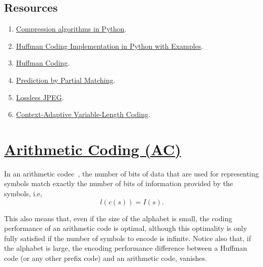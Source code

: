 \subsection*{Resources}
\begin{enumerate}
\item \href{https://www.inference.org.uk/mackay/python/compress/#Huff}{Compression algorithms in Python}.
\item \href{https://favtutor.com/blogs/huffman-coding}{Huffman Coding Implementation in Python with Examples}.
\item \href{https://www.programiz.com/dsa/huffman-coding}{Huffman Coding}.
\item \href{https://en.wikipedia.org/wiki/Prediction_by_partial_matching}{Prediction by Partial Matching}.
\item \href{https://en.wikipedia.org/wiki/Lossless_JPEG}{Lossless JPEG}.
\item \href{https://en.wikipedia.org/wiki/Context-adaptive_variable-length_coding}{Context-Adaptive Variable-Length Coding}.
\end{enumerate}

\section{\href{https://en.wikipedia.org/wiki/Arithmetic_coding}{Arithmetic
    Coding (AC)}}

In an arithmetic codec~\cite{vruiz__arithmetic_coding,ruiz2000compresion}, the number of
bits of data that are used for representing symbols match
exactly the number of bits of information provided by the symbols, i.e,
\begin{equation}
  l(c(s)) = I(s).
\end{equation}

This also means that, even if the size of the alphabet is small, the
coding performance of an arithmetic code is optimal, although this
optimality is only fully satisfied if the number of symbols to encode
is infinite. Notice also that, if the alphabet is large, the encoding
performance difference between a Huffman code (or any other prefix
code) and an arithmetic code, vanishes.

